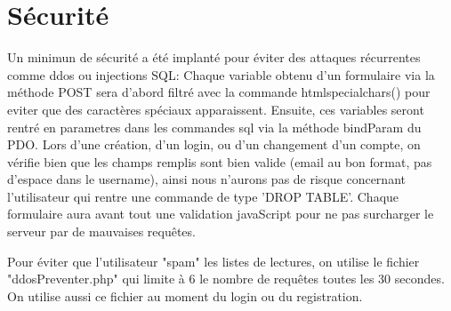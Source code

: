 \section{Sécurité}
    Un minimun de sécurité a été implanté pour éviter des attaques récurrentes comme ddos ou injections SQL:\newline
Chaque variable obtenu d'un formulaire via la méthode POST sera d'abord filtré avec la commande htmlspecialchars() pour eviter que des caractères spéciaux apparaissent. Ensuite, ces variables seront rentré en parametres dans les commandes sql via la méthode bindParam du PDO.\newline
Lors d'une création, d'un login, ou d'un changement d'un compte, on vérifie bien que les champs remplis sont bien valide (email au bon format, pas d'espace dans le username), ainsi nous n'aurons pas de risque concernant l'utilisateur qui rentre une commande de type 'DROP TABLE'.\newline
Chaque formulaire aura avant tout une validation javaScript pour ne pas surcharger le serveur par de mauvaises requêtes.\newline\newline

Pour éviter que l'utilisateur "spam" les listes de lectures, on utilise le fichier "ddosPreventer.php" qui limite à 6 le nombre de requêtes toutes les 30 secondes. On utilise aussi ce fichier au moment du login ou du registration. 

